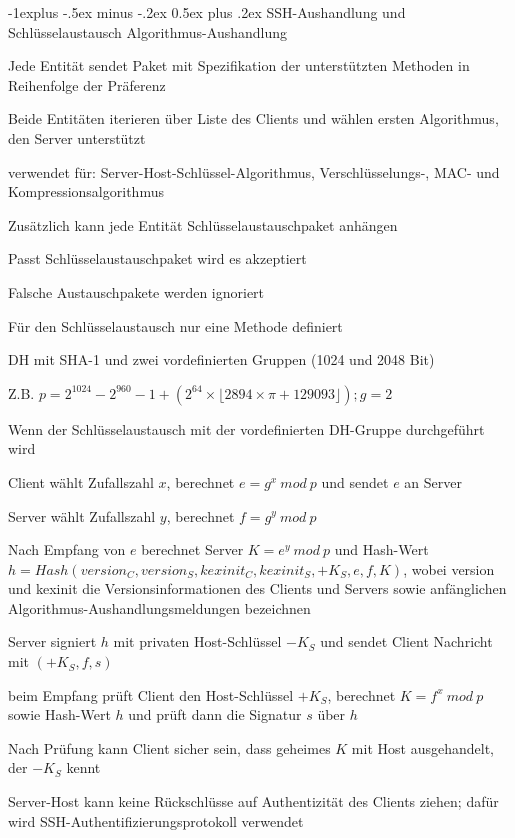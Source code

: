 \documentclass[a4paper]{article}
\makeatletter
\renewcommand{\subsection}{\@startsection{subsection}{2}{0mm}%
 {-1explus -.5ex minus -.2ex}%
 {0.5ex plus .2ex}%
 {\normalfont\normalsize\bfseries}}
\makeatother
\begin{document}
\begin{multicols}{3}
      \subsection{SSH-Aushandlung und Schlüsselaustausch}
      Algorithmus-Aushandlung
      \begin{itemize*}
            \item Jede Entität sendet Paket mit Spezifikation der unterstützten Methoden in Reihenfolge der Präferenz
            \item Beide Entitäten iterieren über Liste des Clients und wählen ersten Algorithmus, den Server unterstützt
            \item verwendet für: Server-Host-Schlüssel-Algorithmus, Verschlüsselungs-, MAC- und Kompressionsalgorithmus
            \item Zusätzlich kann jede Entität Schlüsselaustauschpaket anhängen
            \item Passt Schlüsselaustauschpaket wird es akzeptiert
            \item Falsche Austauschpakete werden ignoriert%
      \end{itemize*}
      Für den Schlüsselaustausch nur eine Methode definiert
      \begin{itemize*}
            \item DH mit SHA-1 und zwei vordefinierten Gruppen (1024 und 2048 Bit)
            \item Z.B. $p = 2^{1024} -2^{960} - 1 + (2^{64}\times \lfloor 2894 \times \pi + 129093\rfloor); g = 2$
      \end{itemize*}
      Wenn der Schlüsselaustausch mit der vordefinierten DH-Gruppe durchgeführt wird
      \begin{itemize*}
            \item Client wählt Zufallszahl $x$, berechnet $e=g^x\ mod\ p$ und sendet $e$ an Server
            \item Server wählt Zufallszahl $y$, berechnet $f=g^y\ mod\ p$
            \item Nach Empfang von $e$ berechnet Server $K=e^y\ mod\ p$ und Hash-Wert $h = Hash(version_C, version_S, kexinit_C, kexinit_S, +K_S, e, f, K)$, wobei version und kexinit die Versionsinformationen des Clients und Servers sowie anfänglichen Algorithmus-Aushandlungsmeldungen bezeichnen
            \item Server signiert $h$ mit privaten Host-Schlüssel $-K_S$ und sendet Client Nachricht mit $(+K_S, f, s)$
            \item beim Empfang prüft Client den Host-Schlüssel $+K_S$, berechnet $K=f^x\ mod\ p$ sowie Hash-Wert $h$ und prüft dann die Signatur $s$ über $h$
            \item Nach Prüfung kann Client sicher sein, dass geheimes $K$ mit Host ausgehandelt, der $-K_S$ kennt
            \item Server-Host kann keine Rückschlüsse auf Authentizität des Clients ziehen; dafür wird SSH-Authentifizierungsprotokoll verwendet
      \end{itemize*}


\end{multicols}
\end{document}
